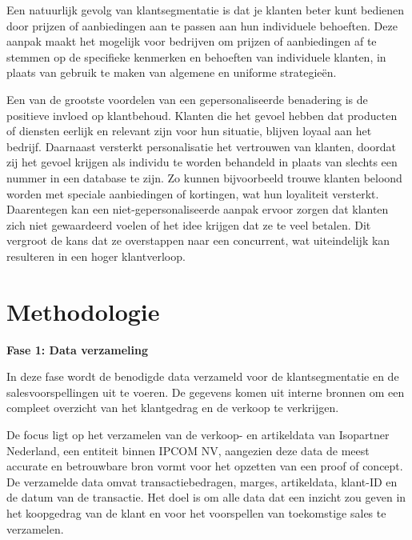 Een natuurlijk gevolg van klantsegmentatie is dat je klanten beter kunt bedienen door prijzen of aanbiedingen aan te passen aan hun individuele behoeften. Deze aanpak maakt het mogelijk voor bedrijven om prijzen of aanbiedingen af te stemmen op de specifieke kenmerken en behoeften van individuele klanten, in plaats van gebruik te maken van algemene en uniforme strategieën.

Een van de grootste voordelen van een gepersonaliseerde benadering is de positieve invloed op klantbehoud. Klanten die het gevoel hebben dat producten of diensten eerlijk en relevant zijn voor hun situatie, blijven loyaal aan het bedrijf. Daarnaast versterkt personalisatie het vertrouwen van klanten, doordat zij het gevoel krijgen als individu te worden behandeld in plaats van slechts een nummer in een database te zijn. Zo kunnen bijvoorbeeld trouwe klanten beloond worden met speciale aanbiedingen of kortingen, wat hun loyaliteit versterkt. Daarentegen kan een niet-gepersonaliseerde aanpak ervoor zorgen dat klanten zich niet gewaardeerd voelen of het idee krijgen dat ze te veel betalen. Dit vergroot de kans dat ze overstappen naar een concurrent, wat uiteindelijk kan resulteren in een hoger klantverloop.\autocite{Adeniran2024}





\section{Methodologie}%
\label{sec:methodologie}


\textbf{Fase 1: Data verzameling}

In deze fase wordt de benodigde data verzameld voor de klantsegmentatie en de salesvoorspellingen uit te voeren. De gegevens komen uit interne bronnen om een compleet overzicht van het klantgedrag en de verkoop te verkrijgen.

De focus ligt op het verzamelen van de verkoop- en artikeldata van Isopartner Nederland, een entiteit binnen IPCOM NV, aangezien deze data de meest accurate en betrouwbare bron vormt voor het opzetten van een proof of concept. De verzamelde data omvat transactiebedragen, marges, artikeldata, klant-ID en de datum van de  transactie. Het doel is om alle data dat een inzicht zou geven in het koopgedrag van de klant en voor het voorspellen van toekomstige sales te verzamelen. 

